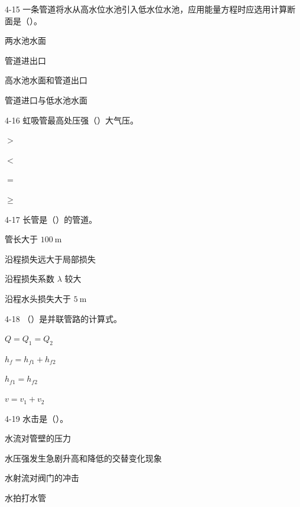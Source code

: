\begin{ti}
\item[4-15] 一条管道将水从高水位水池引入低水位水池，应用能量方程时应选用计算断面是（\quad）。
\begin{choices}
\item 两水池水面
\item 管道进出口
\item 高水池水面和管道出口
\item 管道进口与低水池水面
\end{choices}

\item[4-16] 虹吸管最高处压强（\quad）大气压。
\begin{choices}
\item $>$
\item $<$
\item $=$
\item $\ge$
\end{choices}

\item[4-17] 长管是（\quad）的管道。
\begin{choices}
\item 管长大于 $100\ \mathrm{m}$
\item 沿程损失远大于局部损失
\item 沿程损失系数 $\lambda$ 较大
\item 沿程水头损失大于 $5\ \mathrm{m}$
\end{choices}

\item[4-18] （\quad）是并联管路的计算式。
\begin{choices}
\item $Q=Q_1=Q_2$
\item $h_f=h_{f1}+h_{f2}$
\item $h_{f1}=h_{f2}$
\item $v=v_1+v_2$
\end{choices}

\item[4-19] 水击是（\quad）。
\begin{choices}
\item 水流对管壁的压力
\item 水压强发生急剧升高和降低的交替变化现象
\item 水射流对阀门的冲击
\item 水拍打水管
\end{choices}


\end{ti}
